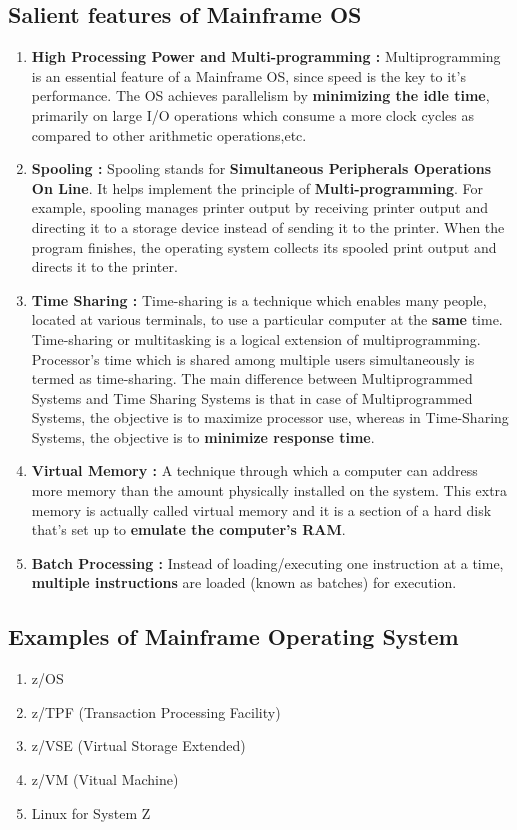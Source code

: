 \documentclass{article}
\begin{document}
      \subsection{Salient features of Mainframe OS}
      \begin{enumerate}
         \item \textbf{High Processing Power and Multi-programming :} Multiprogramming is an essential feature of a Mainframe OS, since speed is the key to it's performance. The OS achieves parallelism by \textbf{minimizing the idle time}, primarily on large I/O operations which consume a more clock cycles as compared to other arithmetic operations,etc.  
      \item \textbf{Spooling :} Spooling stands for \textbf{Simultaneous Peripherals Operations On Line}. It helps implement the principle of \textbf{Multi-programming}. For example, spooling manages printer output by receiving printer output and directing it to a storage device instead of sending it to the printer. When the program finishes, the operating system collects its spooled print output and directs it to the printer.
      \item \textbf{Time Sharing :} Time-sharing is a technique which enables many people, located at various terminals, to use a particular computer at the \textbf{same} time. Time-sharing or multitasking is a logical extension of multiprogramming. Processor's time which is shared among multiple users simultaneously is termed as time-sharing. The main difference between Multiprogrammed Systems and Time Sharing Systems is that in case of Multiprogrammed Systems, the objective is to maximize processor use, whereas in Time-Sharing Systems, the objective is to \textbf{minimize response time}.
      \item \textbf{Virtual Memory :} A technique through which a computer can address more memory than the amount physically installed on the system. This extra memory is actually called virtual memory and it is a section of a hard disk that's set up to \textbf{emulate the computer's RAM}.
      \item \textbf{Batch Processing :} Instead of loading/executing one
      instruction at a time, \textbf{multiple instructions} are loaded (known as batches) for execution.
       \end{enumerate}
       \subsection{Examples of Mainframe Operating System}
       \begin{enumerate}
           \item z/OS
           \item z/TPF (Transaction Processing Facility)
           \item z/VSE (Virtual Storage Extended)
           \item z/VM (Vitual Machine)
           \item Linux for System Z
       \end{enumerate}
       \iffalse
       
\end{document}
